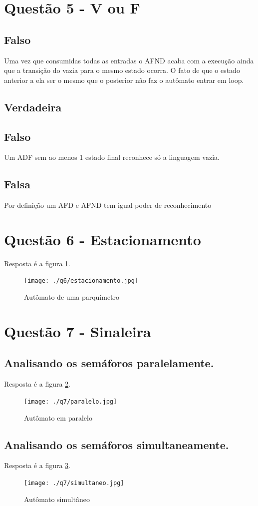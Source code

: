\documentclass[11pt]{article}
\begin{document}
\pagebreak
\section{Questão 5  - V ou F}
\label{sec:org6b9a8d2}
\subsection{Falso}
\label{sec:orga4c2fd6}
Uma vez que consumidas todas as entradas o AFND acaba com a execução ainda que a transição do vazia para o mesmo estado ocorra.  O fato de que o estado anterior a ela ser o mesmo que o posterior não faz o autômato entrar em loop.
\subsection{Verdadeira}
\label{sec:org9a250ef}
\subsection{Falso}
\label{sec:org7a740f2}
Um ADF sem ao menos 1 estado final reconhece só a linguagem vazia.
\subsection{Falsa}
\label{sec:org0464e23}
Por definição um AFD e AFND tem igual poder de reconhecimento

\pagebreak
\section{Questão 6 - Estacionamento}
\label{sec:orge6e3296}
Resposta é a figura \ref{fig:org5aba085}.
\begin{figure}[htbp]
\centering
\texttt{[image: ./q6/estacionamento.jpg]}
\caption{\label{fig:org5aba085}
Autômato de uma parquímetro}
\end{figure}
\pagebreak
\section{Questão 7 - Sinaleira}
\label{sec:orgdab43f0}
\subsection{Analisando os semáforos paralelamente.}
\label{sec:orgc9d3b14}

Resposta é a figura \ref{fig:org43b0e2f}.
\begin{figure}[htbp]
\centering
\texttt{[image: ./q7/paralelo.jpg]}
\caption{\label{fig:org43b0e2f}
Autômato em paralelo}
\end{figure}

\subsection{Analisando os semáforos simultaneamente.}
\label{sec:org01d9a16}

Resposta é a figura \ref{fig:org0e3757e}.
\begin{figure}[htbp]
\centering
\texttt{[image: ./q7/simultaneo.jpg]}
\caption{\label{fig:org0e3757e}
Autômato simultâneo}
\end{figure}
\end{document}
